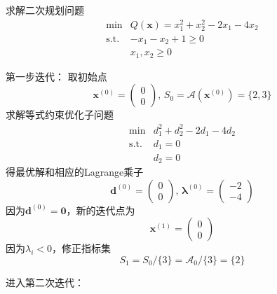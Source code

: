 \begin{example}
    求解二次规划问题
    \[
        \begin{array}{rl}
            \operatorname*{min} & Q(\boldsymbol{x})=x_{1}^{2}+x_{2}^{2}-2x_{1}-4x_{2}\\
            \mathrm{s.t.}&-x_{1}-x_{2}+1\geqslant0\\
            &x_{1},x_{2}\geqslant 0
        \end{array}
    \]
    \begin{solution}
        \colorbox{cyan!50}{第一步迭代：}
        取初始点
        \[
            \boldsymbol{x}^{(0)}=\begin{pmatrix}0\\0\end{pmatrix},\, S_0=\mathcal{A}(\boldsymbol{x}^{(0)})=\{2,3\}
        \]
        求解等式约束优化子问题
        \[
            \begin{array}{rl}
                \min & d_{1}^{2}+d_{2}^{2}-2d_{1}-4d_{2}\\
                \mathrm{s.t.} & d_{1}=0\\
                & d_{2}=0
            \end{array}
        \]
        得最优解和相应的Lagrange乘子
        \[
            \boldsymbol{d}^{(0)}=\begin{pmatrix}0\\0\end{pmatrix},\,
            \boldsymbol{\lambda}^{(0)}=\begin{pmatrix}-2\\-4\end{pmatrix}
        \]
        因为$\boldsymbol{d}^{(0)} = \boldsymbol{0}$，新的迭代点为
        \[
            \boldsymbol{x}^{(1)}=\begin{pmatrix}0\\0\end{pmatrix}
        \]
        因为$\lambda_{i} <0$，修正指标集
        \[
            S_1=S_0/\{3\}=\mathcal{A}_0/\{3\}=\{2\}
        \]

        \colorbox{cyan!50}{进入第二次迭代：}


\end{solution}
\end{example}
